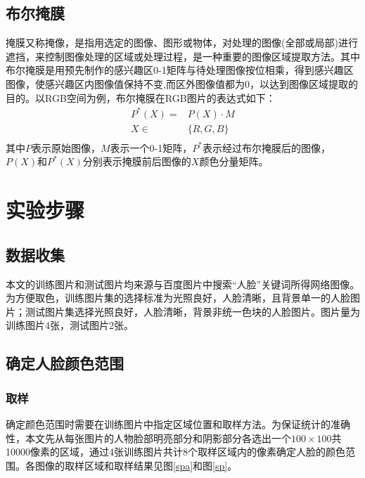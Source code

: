\documentclass[a4paper]{ctexart}
\begin{document}
\begin{spacing}{1.5}
\subsection{布尔掩膜}
掩膜又称掩像，是指用选定的图像、图形或物体，对处理的图像(全部或局部)进行遮挡，来控制图像处理的区域或处理过程，是一种重要的图像区域提取方法\cite{RN53}。其中布尔掩膜是用预先制作的感兴趣区0-1矩阵与待处理图像按位相乘，得到感兴趣区图像，使感兴趣区内图像值保持不变,而区外图像值都为0，以达到图像区域提取的目的。以RGB空间为例，布尔掩膜在RGB图片的表达式如下：
\begin{equation}
\label{eq1}
\begin{split}
P^{*}(X)=&P(X)\cdot M\\
X\in&\{R,G,B\}\\
\end{split}
\end{equation}
其中$P$表示原始图像，$M$表示一个0-1矩阵，$P^{*}$表示经过布尔掩膜后的图像，$P(X)$和$P^{*}(X)$分别表示掩膜前后图像的$X$颜色分量矩阵。
\section{实验步骤}
\subsection{数据收集}
本文的训练图片和测试图片均来源与百度图片中搜索“人脸”关键词所得网络图像。为方便取色，训练图片集的选择标准为光照良好，人脸清晰，且背景单一的人脸图片；测试图片集选择光照良好，人脸清晰，背景非统一色块的人脸图片。图片量为训练图片4张，测试图片2张。
\subsection{确定人脸颜色范围}
\subsubsection{取样}
确定颜色范围时需要在训练图片中指定区域位置和取样方法。为保证统计的准确性，本文先从每张图片的人物脸部明亮部分和阴影部分各选出一个$100\times100$共10000像素的区域，通过4张训练图片共计8个取样区域内的像素确定人脸的颜色范围。各图像的取样区域和取样结果见图\ref{spa}和图\ref{sp}。


\end{spacing}
\end{document}
